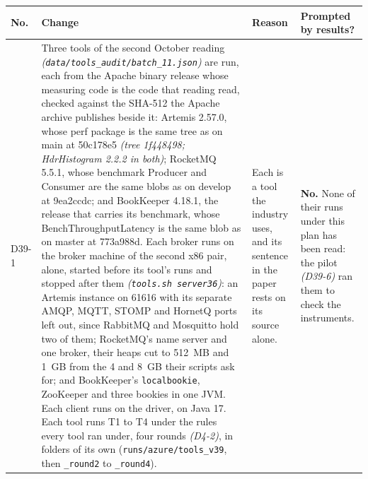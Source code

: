 \documentclass[11pt]{article}
\newcommand{\gl}[1]{{\color{soft}\itshape\small (#1)}}
\begin{document}
{\small
\begin{longtable}{@{}p{1.1cm} >{\raggedright\arraybackslash}p{6.1cm} >{\raggedright\arraybackslash}p{6.0cm} >{\raggedright\arraybackslash}p{2.2cm}@{}}
\toprule
\textbf{No.} & \textbf{Change} & \textbf{Reason} & \textbf{Prompted by results?} \\
\midrule
\endhead
D39-1 & Three tools of the second October reading \gl{\texttt{data/tools\_audit/batch\_11.json}} are run, each from the Apache binary release whose measuring code is the code that reading read, checked against the SHA-512 the Apache archive publishes beside it: Artemis 2.57.0, whose perf package is the same tree as on main at 50c178e5 \gl{tree 1f448498; HdrHistogram 2.2.2 in both}; RocketMQ 5.5.1, whose benchmark Producer and Consumer are the same blobs as on develop at 9ea2ccdc; and BookKeeper 4.18.1, the release that carries its benchmark, whose BenchThroughputLatency is the same blob as on master at 773a988d. Each broker runs on the broker machine of the second x86 pair, alone, started before its tool's runs and stopped after them \gl{\texttt{tools.sh server36}}: an Artemis instance on 61616 with its separate AMQP, MQTT, STOMP and HornetQ ports left out, since RabbitMQ and Mosquitto hold two of them; RocketMQ's name server and one broker, their heaps cut to 512~MB and 1~GB from the 4 and 8~GB their scripts ask for; and BookKeeper's \texttt{localbookie}, ZooKeeper and three bookies in one JVM. Each client runs on the driver, on Java 17. Each tool runs T1 to T4 under the rules every tool ran under, four rounds \gl{D4-2}, in folders of its own (\texttt{runs/azure/tools\_v39}, then \texttt{\_round2} to \texttt{\_round4}). & Each is a tool the industry uses, and its sentence in the paper rests on its source alone. & \textbf{No.} None of their runs under this plan has been read: the pilot \gl{D39-6} ran them to check the instruments. \\

\end{longtable}}
\end{document}
